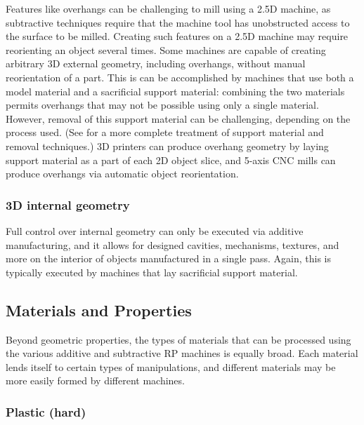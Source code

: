 Features like overhangs can be challenging to mill using a 2.5D machine, as subtractive techniques require that the machine tool has unobstructed access to the surface to be milled. Creating such features on a 2.5D machine may require reorienting an object several times. Some machines are capable of creating arbitrary 3D external geometry, including overhangs, without manual reorientation of a part. This is can be accomplished by machines that use both a model material and a sacrificial support material: combining the two materials permits overhangs that may not be possible using only a single material. However, removal of this support material can be challenging, depending on the process used. (See \cite{savage-sot} for a more complete treatment of support material and removal techniques.) 3D printers can produce overhang geometry by laying support material as a part of each 2D object slice, and 5-axis CNC mills can produce overhangs via automatic object reorientation.

\subsubsection{3D internal geometry}

Full control over internal geometry can only be executed via additive manufacturing, and it allows for designed cavities, mechanisms, textures, and more on the interior of objects manufactured in a single pass. Again, this is typically executed by machines that lay sacrificial support material.

\subsection{Materials and Properties}

Beyond geometric properties, the types of materials that can be processed using the various additive and subtractive RP machines is equally broad. Each material lends itself to certain types of manipulations, and different materials may be more easily formed by different machines.


\subsubsection{Plastic (hard)}

